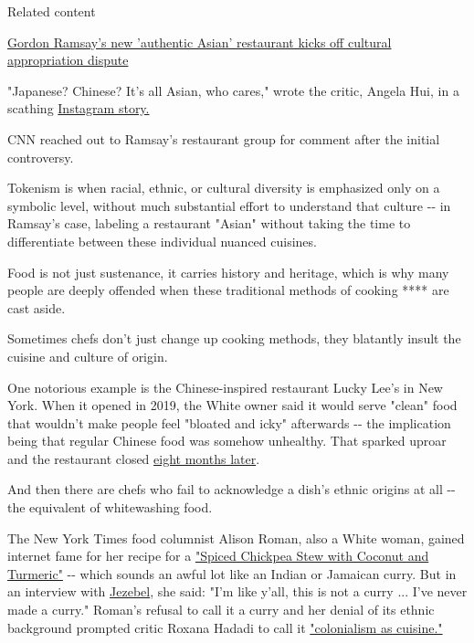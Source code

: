 Related content

\href{/travel/article/gordon-ramsey-asian-restaurant-cultural-appropriation-intl-scli/index.html}{Gordon
Ramsay's new 'authentic Asian' restaurant kicks off cultural
appropriation dispute}

"Japanese? Chinese? It's all Asian, who cares," wrote the critic, Angela
Hui, in a scathing
\href{https://london.eater.com/2019/4/11/18306082/gordon-ramsay-cultural-appropriation-lucky-cat-london-preview}{Instagram
story.}

CNN reached out to Ramsay's restaurant group for comment after the
initial controversy.

Tokenism is when racial, ethnic, or cultural diversity is emphasized
only on a symbolic level, without much substantial effort to understand
that culture -\/- in Ramsay's case, labeling a restaurant "Asian"
without taking the time to differentiate between these individual
nuanced cuisines.

Food is not just sustenance, it carries history and heritage, which is
why many people are deeply offended when these traditional methods of
cooking **** are cast aside.

Sometimes chefs don't just change up cooking methods, they blatantly
insult the cuisine and culture of origin.

One notorious example is the Chinese-inspired restaurant Lucky Lee's in
New York. When it opened in 2019, the White owner said it would serve
"clean" food that wouldn't make people feel "bloated and icky"
afterwards -\/- the implication being that regular Chinese food was
somehow unhealthy. That sparked uproar and the restaurant closed
\href{https://ny.eater.com/2019/12/6/20999639/lucky-lees-greenwich-village-clean-chinese-closed}{eight
months later}.

And then there are chefs who fail to acknowledge a dish's ethnic origins
at all -\/- the equivalent of whitewashing food.

The New York Times food columnist Alison Roman, also a White woman,
gained internet fame for her recipe for a
\href{https://cooking.nytimes.com/recipes/1019772-spiced-chickpea-stew-with-coconut-and-turmeric}{"Spiced
Chickpea Stew with Coconut and Turmeric"} -\/- which sounds an awful lot
like an Indian or Jamaican curry. But in an interview with
\href{https://jezebel.com/alison-roman-is-more-than-thestew-1838861751}{Jezebel},
she said: "I'm like y'all, this is not a curry ... I've never made a
curry." Roman's refusal to call it a curry and her denial of its ethnic
background prompted critic Roxana Hadadi to call it
\href{https://www.pajiba.com/celebrities_are_better_than_you/alison-roman-and-the-exhausting-prevalence-of-ethnic-erasure-in-popular-food-culture.php}{"colonialism
as cuisine."}

